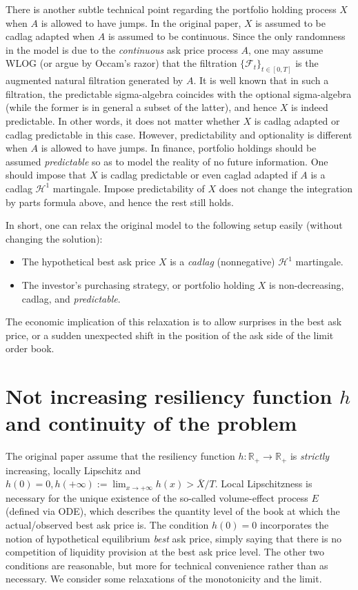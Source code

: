\documentclass[openany,oneside]{article}
\theoremstyle{definition}
\theoremstyle{remark}
\begin{document}
There is another subtle technical point regarding the portfolio holding process $X$ when $A$ is allowed to have jumps. In the original paper, $X$ is assumed to be cadlag adapted when $A$ is assumed to be continuous. Since the only randomness in the model is due to the \emph{continuous} ask price process $A$, one may assume WLOG (or argue by Occam's razor) that the filtration $\{\mathcal{F}_t\}_{t\in[0,T]}$ is the augmented natural filtration generated by $A$. It is well known\citep{protter2005stochastic} that in such a filtration, the predictable sigma-algebra coincides with the optional sigma-algebra (while the former is in general a subset of the latter), and hence $X$ is indeed predictable. In other words, it does not matter whether $X$ is cadlag adapted or cadlag predictable in this case. However, predictability and optionality is different when $A$ is allowed to have jumps. In finance, portfolio holdings should be assumed \emph{predictable} so as to model the reality of no future information. One should impose that $X$ is cadlag predictable or even caglad adapted if $A$ is a cadlag $\mathcal{H}^1$ martingale. Impose predictability of $X$ does not change the integration by parts formula above, and hence the rest still holds.

In short, one can relax the original model to the following setup easily (without changing the solution):
\begin{itemize}
\item The hypothetical best ask price $X$ is a \emph{cadlag} (nonnegative) $\mathcal{H}^1$ martingale.
\item The investor's purchasing strategy, or portfolio holding $X$ is non-decreasing, cadlag, and \emph{predictable}.
\end{itemize}

The economic implication of this relaxation is to allow surprises in the best ask price, or a sudden unexpected shift in the position of the ask side of the limit order book.


\section{Not increasing resiliency function $h$ and continuity of the problem}
The original paper assume that the resiliency function $h:\mathbb{R}_+ \to \mathbb{R}_+$ is \emph{strictly} increasing, locally Lipschitz and $h(0) = 0, h(+\infty) := \lim_{x\to +\infty} h(x) > \bar{X}/T$. Local Lipschitzness is necessary for the unique existence of the so-called volume-effect process $E$ (defined via ODE), which describes the quantity level of the book at which the actual/observed best ask price is. The condition $h(0)=0$ incorporates the notion of hypothetical equilibrium \emph{best} ask price, simply saying that there is no competition of liquidity provision at the best ask price level. The other two conditions are reasonable, but more for technical convenience rather than as necessary. We consider some relaxations of the monotonicity and the limit.
\end{document}
